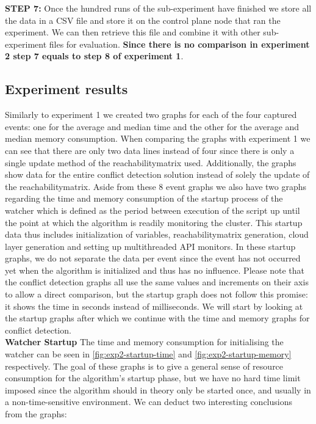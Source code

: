 \textbf{STEP 7:} Once the hundred runs of the sub-experiment have finished we store all the data in a CSV file and store it on the control plane node that ran the experiment. We can then retrieve this file and combine it with other sub-experiment files for evaluation.  \textbf{Since there is no comparison in experiment 2 step 7 equals to step 8 of experiment 1}. 
\\[10pt]


\subsection{Experiment results} \label{exp2:results}
Similarly to experiment 1 we created two graphs for each of the four captured events: one for the average and median time and the other for the average and median memory consumption. When comparing the graphs with experiment 1 we can see that there are only two data lines instead of four since there is only a single update method of the reachabilitymatrix used. Additionally, the graphs show data for the entire conflict detection solution instead of solely the update of the reachabilitymatrix. Aside from these 8 event graphs we also have two graphs regarding the time and memory consumption of the startup process of the watcher which is defined as the period between execution of the script up until the point at which the algorithm is readily monitoring the cluster. This startup data thus includes initialization of variables, reachabilitymatrix generation, cloud layer generation and setting up multithreaded API monitors. In these startup graphs, we do not separate the data per event since the event has not occurred yet when the algorithm is initialized and thus has no influence. Please note that the conflict detection graphs all use the same values and increments on their axis to allow a direct comparison, but the startup graph does not follow this promise: it shows the time in seconds instead of milliseconds. We will start by looking at the startup graphs after which we continue with the time and memory graphs for conflict detection.
\\[10pt]

\textbf{Watcher Startup}
\newline The time and memory consumption for initialising the watcher can be seen in \autoref{fig:exp2-startup-time} and \autoref{fig:exp2-startup-memory} respectively. The goal of these graphs is to give a general sense of resource consumption for the algorithm's startup phase, but we have no hard time limit imposed since the algorithm should in theory only be started once, and usually in a non-time-sensitive environment. We can deduct two interesting conclusions from the graphs:

